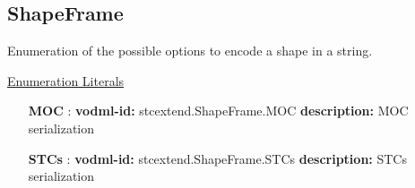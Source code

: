   \subsection{ShapeFrame}
  \label{sect:stcextend.ShapeFrame}

  Enumeration of the possible options to encode a shape in a string.

  \noindent \underline{Enumeration Literals}
  \vspace{-\parsep}
  \small
  \begin{itemize}
  
    \item[\textbf{MOC}]: \textbf{vodml-id:} stcextend.ShapeFrame.MOC \newline
          \textbf{description:} MOC serialization
    \item[\textbf{STCs}]: \textbf{vodml-id:} stcextend.ShapeFrame.STCs \newline
          \textbf{description:} STCs serialization
  \end{itemize}
  \normalsize
